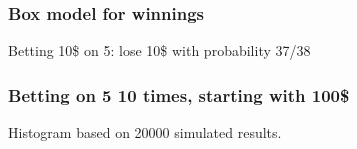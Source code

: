 \documentclass[handout]{beamer}
\begin{document}


   \begin{frame}
   \frametitle{Box model for winnings}
   \begin{center}
   \end{center}
   Betting 10\$ on {\color{red} 5}: lose 10\$ with probability 37/38
   \end{frame}



   \begin{frame}
   \frametitle{Betting on {\color{red} 5} 10 times, starting with 100\$}
   \begin{center}
   \end{center}
   Histogram based on 20000 simulated results.
   \end{frame}

\end{document}
